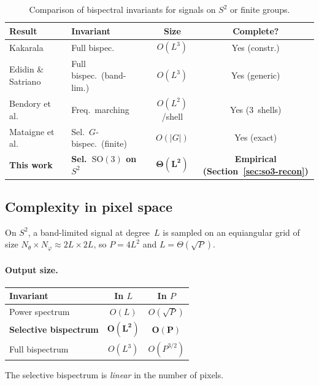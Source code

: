 \documentclass{article}
\theoremstyle{definition}
\theoremstyle{remark}
\newcommand{\SO}{\mathrm{SO}}
\theoremstyle{definition}
\begin{document}
\begin{table}[h]
  \caption{Comparison of bispectral invariants for signals on $S^2$ or
    finite groups.}
  \label{tab:app-comparison}
  \centering
  \small
  \setlength{\tabcolsep}{4pt}
  \begin{tabular}{@{}l l c c@{}}
    \toprule
    Result & Invariant & Size & Complete? \\
    \midrule
    Kakarala~\citep{kakarala2012bispectrum}
      & Full bispec. & $O(L^3)$ & Yes (constr.) \\
    Edidin \& Satriano~\citep{edidin2024orbit}
      & Full bispec.\ (band-lim.)
      & $O(L^3)$ & Yes (generic) \\
    Bendory et al.~\citep{bendory2025orbit}
      & Freq.\ marching
      & $O(L^2)$/shell & Yes (3~shells) \\
    Mataigne et al.~\citep{mataigne2024selective}
      & Sel.\ $G$-bispec.\ (finite)
      & $O(|G|)$ & Yes (exact) \\
    \textbf{This work}
      & \textbf{Sel.\ $\SO(3)$ on $S^2$}
      & $\boldsymbol{\Theta(L^2)}$
      & \textbf{Empirical (Section~\ref{sec:so3-recon})} \\
    \bottomrule
  \end{tabular}
\end{table}

\subsection{Complexity in pixel space}
\label{sec:app-pixel-complexity}

On $S^2$, a band-limited signal at degree~$L$ is sampled on an
equiangular grid of size $N_\theta \times N_\varphi \approx 2L \times 2L$,
so $P = 4L^2$ and $L = \Theta(\sqrt{P})$.

\paragraph{Output size.}
\begin{center}
\small
\begin{tabular}{lcc}
  \toprule
  Invariant & In $L$ & In $P$ \\
  \midrule
  Power spectrum & $O(L)$ & $O(\sqrt{P})$ \\
  \textbf{Selective bispectrum} & $\boldsymbol{O(L^2)}$
    & $\boldsymbol{O(P)}$ \\
  Full bispectrum & $O(L^3)$ & $O(P^{3/2})$ \\
  \bottomrule
\end{tabular}
\end{center}
The selective bispectrum is \emph{linear} in the number of pixels.
\end{document}
